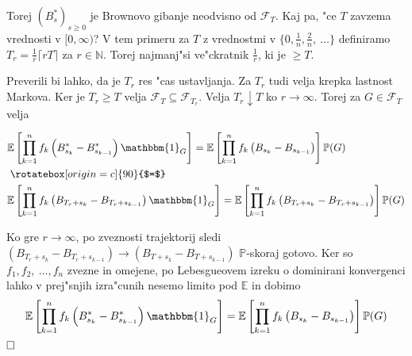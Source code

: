\documentclass[twoside,11pt]{article}
\begin{document}
\begin{dokaz}
\begin{enumerate}
    \end{enumerate}
    Torej $(B^*_s)_{s\geq0}$ je Brownovo gibanje neodvisno od $\mathcal{F}_T$.
    \noindent
    Kaj pa, "ce $T$ zavzema vrednosti v $[0, \infty)$? V tem primeru za $T$ z vrednostmi v $\{0, \tfrac{1}{n}, \tfrac{2}{n}, \ \ldots \}$
    definiramo $T_r = \tfrac{1}{r}\lceil rT\rceil$ za $r\in\mathbb{N}$. Torej najmanj"si ve"ckratnik $\tfrac{1}{r}$, ki je $ \geq T$.

    \begin{figure}[h]
        \centering
    \end{figure}
    
   
    \noindent
     Preverili bi lahko, da je $T_r$ res "cas ustavljanja. Za $T_r$ tudi velja krepka lastnost Markova. Ker je $T_r \geq T$ velja $\mathcal{F}_{T} \subseteq \mathcal{F}_{T_r}$. Velja $T_r \downarrow T$ ko $r \rightarrow \infty$. Torej za $G \in \mathcal{F}_T$ velja

     \begin{align*}
        &\mathbb{E}\left[\prod_{k=1}^nf_k\left(B^*_{s_k} - B^*_{s_{k-1}}\right)\mathbbm{1}_G\right] = \mathbb{E}\left[\prod_{k=1}^nf_k\left(B_{s_k} - B_{s_{k-1}}\right)\right]\mathbb{P}(G) \\
        &\mathrel{\rotatebox[origin=c]{90}{$=$}} \\
        &\mathbb{E}\left[\prod_{k=1}^nf_k\left(B_{T_r +s_k} - B_{T_r + s_{k-1}}\right)\mathbbm{1}_G\right] = \mathbb{E}\left[\prod_{k=1}^nf_k\left(B_{T_r + s_k} - B_{T_r + s_{k-1}}\right)\right]\mathbb{P}(G)
    \end{align*}

    \noindent
    Ko gre $r \rightarrow \infty$, po zveznosti trajektorij sledi $(B_{T_r + s_k} - B_{T_r + s_{k-1}}) \rightarrow (B_{T + s_k} - B_{T + s_{k-1}})$ $\mathbb{P}$-skoraj gotovo. Ker so $f_1, f_2, \ \dots, f_n$  zvezne in omejene, po  Lebesgueovem izreku o dominirani konvergenci lahko v prej"snjih izra"cunih nesemo limito pod $\mathbb{E}$ in dobimo
    $$
        \mathbb{E}\left[\prod_{k=1}^nf_k\left(B^*_{s_k} - B^*_{s_{k-1}}\right)\mathbbm{1}_G\right] = \mathbb{E}\left[\prod_{k=1}^nf_k\left(B_{s_k} - B_{s_{k-1}}\right)\right]\mathbb{P}(G)
    $$
     $\hfill \square$
\end{dokaz}
\end{document}
